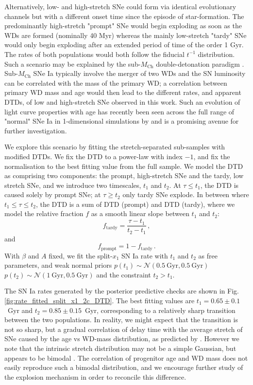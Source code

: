 \documentclass[fleqn,usenatbib]{mnras}
\begin{document}
Alternatively, low- and high-stretch SNe could form via identical evolutionary channels but with a different onset time since the episode of star-formation. The predominantly high-stretch "prompt" SNe would begin exploding as soon as the WDs are formed (nominally 40 Myr) whereas the mainly low-stretch "tardy" SNe would only begin exploding after an extended period of time of the order 1 Gyr. The rates of both populations would both follow the fiducial $t^{-1}$ distribution.
Such a scenario may be explained by the sub-$M_{\mathrm{Ch}}$ double-detonation paradigm \citep[e.g.][]{Sim2010,Blondin2017,Shen2017a}. Sub-$M_{\mathrm{Ch}}$ SNe Ia typically involve the merger of two WDs and the SN luminosity can be correlated with the mass of the primary WD; a correlation between primary WD mass and age would then lead to the different rates, and apparent DTDs, of low and high-stretch SNe observed in this work. Such an evolution of light curve properties with age has recently been seen across the full range of "normal" SNe Ia in 1-dimensional simulations by \citet{Shen2021} and is a promising avenue for further investigation.

We explore this scenario by fitting the stretch-separated sub-samples with modified DTDs. We fix the DTD to a power-law with index $-1$, and fix the normalisation to the best fitting value from the full sample. We model the DTD as comprising two components: the prompt, high-stretch SNe and the tardy, low stretch SNe, and we introduce two timescales, $t_1$ and $t_2$. At $\tau\leq t_1$, the DTD is caused solely by prompt SNe; at $\tau \geq t_2$ only tardy SNe explode. In between where $t_1 \leq\tau\leq t_2$, the DTD is a sum of DTD (prompt) and DTD (tardy), where we model the relative fraction $f$ as a smooth linear slope between $t_1$ and $t_2$:
\begin{equation}
    f_{\mathrm{tardy}} = \frac{\tau - t_1}{t_2 - t_1}\,,
\end{equation}
and
\begin{equation}
    f_{\mathrm{prompt}} = 1 - f_{\mathrm{tardy}}\,.
\end{equation}
With $\beta$ and $A$ fixed,  we fit the split-$x_1$ SN Ia rate with $t_1$ and $t_2$ as free parameters, and weak normal priors $p(t_1) \sim \mathcal{N}\left(0.5~\mathrm{Gyr}, 0.5~\mathrm{Gyr}\right)$ $p(t_2) \sim \mathcal{N}\left(1~\mathrm{Gyr}, 0.5~\mathrm{Gyr}\right)$ and the constraint $t_2 > t_1$.

The SN Ia rates generated by the posterior predictive checks are shown in Fig. \ref{fig:rate_fitted_split_x1_2c_DTD}. The best fitting values are $t_1 = 0.65 \pm 0.1$~Gyr and $t_2 = 0.85 \pm 0.15$~Gyr, corresponding to a relatively sharp transition between the two populations. In reality, we might expect that the transition is not so sharp, but a gradual correlation of delay time with the average stretch of SNe caused by the age vs WD-mass distribution, as predicted by \citet{Shen2021}. However we note that the intrinsic stretch distribution may not be a simple Gaussian, but appears to be bimodal \citep{Scolnic2016,Popovic2021}. The correlation of progenitor age and WD mass does not easily reproduce such a bimodal distribution, and we encourage further study of the explosion mechanism in order to reconcile this difference.
\end{document}
